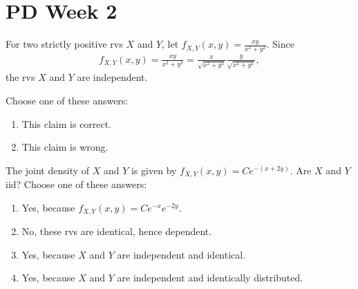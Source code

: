 \documentclass[poll_tutorial_format]{subfiles}
\begin{document}
\section{PD Week 2}

\begin{exercise}
For two strictly positive rvs $X$ and $Y$, let $f_{X,Y}(x, y) = \frac{xy}{x^{2}+y^2}$. Since
\begin{align*}
  f_{X,Y}(x, y) = \frac{xy}{x^{2}+y^2} = \frac{x}{\sqrt{x^{2}+y^2}} \frac{y}{\sqrt{x^{2}+y^2}},
\end{align*}
the rvs $X$ and $Y$ are independent.

Choose one of these answers:
\begin{enumerate}
\item This claim is correct.
\item This claim is wrong.
\end{enumerate}
\end{exercise}



\begin{exercise}
The joint density of $X$ and $Y$ is given by $f_{X,Y}(x,y) = Ce^{-(x + 2y)}$.
Are $X$ and $Y$ iid?
Choose one of these answers:
\begin{enumerate}
\item Yes, because $f_{X,Y}(x, y) = C e^{-x}e^{-2y}$.
\item No,  these rvs are identical, hence dependent.
\item Yes, because $X$ and $Y$ are independent and identical.
\item Yes, because $X$ and $Y$ are independent and identically distributed.
\end{enumerate}
\end{exercise}
\end{document}
